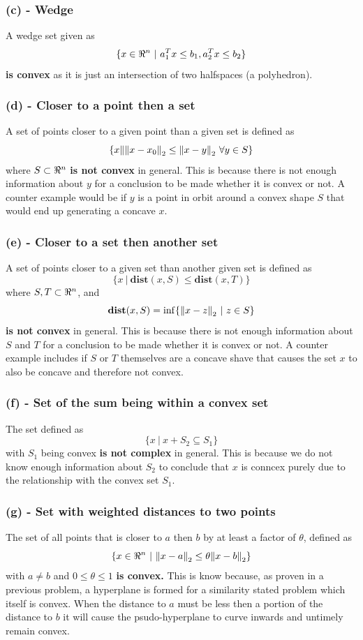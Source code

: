 \documentclass[letter]{article}
\begin{document}
\subsubsection{(c) - Wedge}
A wedge set given as $$\{x \in \real^n \ | \ a_1^T x \leq b_1, a_2^T x \leq b_2\}$$ \textbf{is convex} as it is just an intersection of two halfspaces (a polyhedron).

\subsubsection{(d) - Closer to a point then a set}
A set of points closer to a given point than a given set is defined as $$\{x \| \norm{x-x_0}_2 \leq \norm{x - y}_2 \ \forall y \in S\}$$ where $S\subset\real^n$ \textbf{is not convex} in general. This is because there is not enough information about $y$ for a conclusion to be made whether it is convex or not. A counter example would be if $y$ is a point in orbit around a convex shape $S$ that would end up generating a concave $x$.

\subsubsection{(e) - Closer to a set then another set}
A set of points closer to a given set than another given set is defined as $$\{x \ | \ \textbf{dist}(x,S) \leq \textbf{dist}(x,T)\}$$ where $S, T \subset\real^n$, and $$\textbf{dist}(x,S) = \inf\{\norm{x-z}_2 \ | \ z \in S\}$$ \textbf{is not convex} in general. This is because there is not enough information about $S$ and $T$ for a conclusion to be made whether it is convex or not. A counter example includes if $S$ or $T$ themselves are a concave shave that causes the set $x$ to also be concave and therefore not convex.


\subsubsection{(f) - Set of the sum being within a convex set}
The set defined as $$\{x \ | \ x + S_2 \subseteq S_1\}$$ with $S_1$ being convex \textbf{is not complex} in general. This is because we do not know enough information about $S_2$ to conclude that $x$ is conncex purely due to the relationship with the convex set $S_1$.\\

\subsubsection{(g) - Set with weighted distances to two points}
The set of all points that is closer to $a$ then $b$ by at least a factor of $\theta$, defined as $$\{x \in \real^n \ | \ \norm{x-a}_2 \leq \theta \norm{x-b}_2\}$$ with $a \neq b$ and $0 \leq \theta \leq 1$ \textbf{is convex.} This is know because, as proven in a previous problem, a hyperplane is formed for a similarity stated problem which itself is convex. When the distance to $a$ must be less then a portion of the distance to $b$ it will cause the psudo-hyperplane to curve inwards and untimely remain convex.
\end{document}
